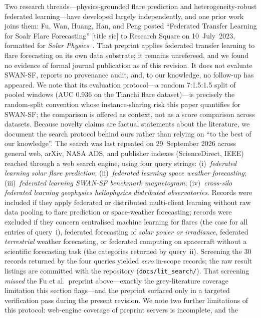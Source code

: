 Two research threads---physics-grounded flare prediction and
heterogeneity-robust federated learning---have developed largely
independently, and one prior work joins them: Fu, Wan, Huang, Han, and
Peng posted ``Federated Transfer Learning for Soalr Flare Forecasting''
[title sic] to Research Square on 10~July~2023, formatted for
\emph{Solar Physics}~\cite{fu2023}. That preprint applies federated
transfer learning to flare forecasting on its own data substrate; it
remains unrefereed, and we found no evidence of formal journal
publication as of this revision. It does not evaluate SWAN-SF, reports
no provenance audit, and, to our knowledge, no follow-up has appeared.
We note that its evaluation protocol---a random 7:1.5:1.5 split of
pooled windows (AUC 0.936 on the Tianchi flare dataset)---is precisely
the random-split convention whose instance-sharing risk this paper
quantifies for SWAN-SF; the comparison is offered as context, not as a
score comparison across datasets.
Because novelty claims are factual statements about the literature, we
document the search protocol behind ours rather than relying on ``to
the best of our knowledge''. The search was last
repeated on 29~September 2026 across general web, arXiv, NASA ADS,
and publisher indexes (ScienceDirect, IEEE) reached through a web
search engine, using four query strings: (i)~\emph{federated learning
solar flare prediction}; (ii)~\emph{federated learning space weather
forecasting}; (iii)~\emph{federated learning SWAN-SF benchmark
magnetogram}; (iv)~\emph{cross-silo federated learning geophysics
heliophysics distributed observatories}. Records were included if
they apply federated or distributed multi-client learning without raw
data pooling to flare prediction or space-weather forecasting; records
were excluded if they concern centralised machine learning for flares
(the case for all entries of query~i), federated forecasting of
\emph{solar power or irradiance}, federated \emph{terrestrial}
weather forecasting, or federated computing on spacecraft without a
scientific forecasting task (the categories returned by query~ii).
Screening the 30 records returned by the four queries yielded
\emph{zero} in-scope records; the raw result listings are committed
with the repository (\texttt{docs/lit\_search/}). That screening
\emph{missed} the Fu et al.\ preprint above---exactly the
grey-literature coverage limitation this section flags---and the
preprint surfaced only in a targeted verification pass during the
present revision. We note two further limitations of this protocol:
web-engine coverage of preprint servers is incomplete, and the
